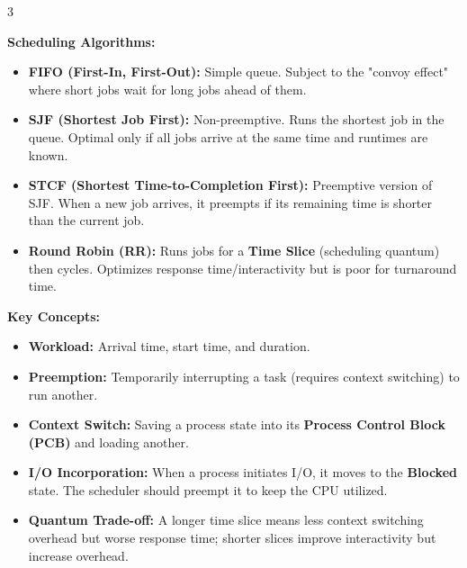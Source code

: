 \documentclass[10pt,landscape]{article}
\begin{document}
\begin{multicols*}{3}
{        \textbf{Scheduling Algorithms:}
        \begin{itemize}
            \item \textbf{FIFO (First-In, First-Out):} Simple queue. Subject to the "convoy effect" where short jobs wait for long jobs ahead of them.
            \item \textbf{SJF (Shortest Job First):} Non-preemptive. Runs the shortest job in the queue. Optimal only if all jobs arrive at the same time and runtimes are known.
            \item \textbf{STCF (Shortest Time-to-Completion First):} Preemptive version of SJF. When a new job arrives, it preempts if its remaining time is shorter than the current job.
            \item \textbf{Round Robin (RR):} Runs jobs for a \textbf{Time Slice} (scheduling quantum) then cycles. Optimizes response time/interactivity but is poor for turnaround time.
        \end{itemize}

        \textbf{Key Concepts:}
        \begin{itemize}
            \item \textbf{Workload:} Arrival time, start time, and duration.
            \item \textbf{Preemption:} Temporarily interrupting a task (requires context switching) to run another.
            \item \textbf{Context Switch:} Saving a process state into its \textbf{Process Control Block (PCB)} and loading another.
            \item \textbf{I/O Incorporation:} When a process initiates I/O, it moves to the \textbf{Blocked} state. The scheduler should preempt it to keep the CPU utilized.
            \item \textbf{Quantum Trade-off:} A longer time slice means less context switching overhead but worse response time; shorter slices improve interactivity but increase overhead.
        \end{itemize}
    }


\end{multicols*}
\end{document}
